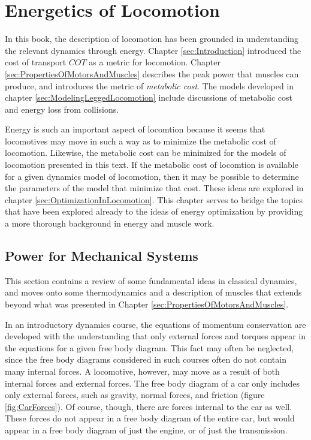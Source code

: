 \chapter{Energetics of Locomotion}
\label{sec:EnergeticsOfLocomotion}

In this book, the description of locomotion has been grounded in understanding the relevant dynamics through energy. Chapter \ref{sec:Introduction} introduced the cost of transport $COT$ as a metric for locomotion. Chapter \ref{sec:PropertiesOfMotorsAndMuscles} describes the peak power that muscles can produce, and introduces the metric of \textit{metabolic cost}. The models developed in chapter \ref{sec:ModelingLeggedLocomotion} include discussions of metabolic cost and energy loss from collisions.

Energy is such an important aspect of locomtion because it seems that locomotives may move in such a way as to minimize the metabolic cost of locomotion. Likewise, the metabolic cost can be minimized for the models of locomotion presented in this text. If the metabolic cost of locomtion is available for a given dynamics model of locomotion, then it may be possible to determine the parameters of the model that minimize that cost. These ideas are explored in chapter \ref{sec:OptimizationInLocomotion}. This chapter serves to bridge the topics that have been explored already to the ideas of energy optimization by providing a more thorough background in energy and muscle work.

\section{Power for Mechanical Systems} %
\label{sec:PowerforMechancialSystems}

This section contains a review of some fundamental ideas in classical dynamics, and moves onto some thermodynamics and a description of muscles that extends beyond what was presented in Chapter \ref{sec:PropertiesOfMotorsAndMuscles}.

In an introductory dynamics course, the equations of momentum conservation are developed with the understanding that only external forces and torques appear in the equations for a given free body diagram. This fact may often be neglected, since the free body diagrams considered in such courses often do not contain many internal forces. A locomotive, however, may move as a result of both internal forces and external forces. The free body diagram of a car only includes only external forces, such as gravity, normal forces, and friction (figure \ref{fig:CarForces}). Of course, though, there are forces internal to the car as well. These forces do not appear in a free body diagram of the entire car, but would appear in a free body diagram of just the engine, or of just the transmission.

